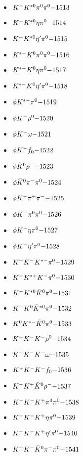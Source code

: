 \begin{multicols}{3}
\begin{itemize}
 \item $ K^{-} K^{*0} \pi^{0} \pi^{0} \hfill{-1513}$
 \item $ K^{-} K^{*0} \eta \pi^{0} \hfill{-1514}$
 \item $ K^{-} K^{*0} {\eta^{\prime}} \pi^{0} \hfill{-1515}$
 \item $ K^{*-} K^{0} \pi^{0} \pi^{0} \hfill{-1516}$
 \item $ K^{*-} K^{0} \eta \pi^{0} \hfill{-1517}$
 \item $ K^{*-} K^{0} {\eta^{\prime}} \pi^{0} \hfill{-1518}$
 \item $ \phi K^{*-} \pi^{0} \hfill{-1519}$
 \item $ \phi K^{-} \rho^{0} \hfill{-1520}$
 \item $ \phi K^{-} \omega \hfill{-1521}$
 \item $ \phi K^{-} f_{0} \hfill{-1522}$
 \item $ \phi \bar{K}^{0} \rho^{-} \hfill{-1523}$
 \item $ \phi \bar{K}^{0} \pi^{-} \pi^{0} \hfill{-1524}$
 \item $ \phi K^{-} \pi^{+} \pi^{-} \hfill{-1525}$
 \item $ \phi K^{-} \pi^{0} \pi^{0} \hfill{-1526}$
 \item $ \phi K^{-} \eta \pi^{0} \hfill{-1527}$
 \item $ \phi K^{-} {\eta^{\prime}} \pi^{0} \hfill{-1528}$
 \item $ K^{+} K^{-} K^{*-} \pi^{0} \hfill{-1529}$
 \item $ K^{-} K^{*+} K^{-} \pi^{0} \hfill{-1530}$
 \item $ K^{-} K^{*0} \bar{K}^{0} \pi^{0} \hfill{-1531}$
 \item $ K^{-} K^{0} \bar{K}^{*0} \pi^{0} \hfill{-1532}$
 \item $ K^{0} K^{*-} \bar{K}^{0} \pi^{0} \hfill{-1533}$
 \item $ K^{+} K^{-} K^{-} \rho^{0} \hfill{-1534}$
 \item $ K^{+} K^{-} K^{-} \omega \hfill{-1535}$
 \item $ K^{+} K^{-} K^{-} f_{0} \hfill{-1536}$
 \item $ K^{-} K^{+} \bar{K}^{0} \rho^{-} \hfill{-1537}$
 \item $ K^{-} K^{-} K^{+} \pi^{0} \pi^{0} \hfill{-1538}$
 \item $ K^{-} K^{-} K^{+} \eta \pi^{0} \hfill{-1539}$
 \item $ K^{-} K^{-} K^{+} {\eta^{\prime}} \pi^{0} \hfill{-1540}$
 \item $ K^{+} K^{-} \bar{K}^{0} \pi^{-} \pi^{0} \hfill{-1541}$

\end{itemize}
\end{multicols}
